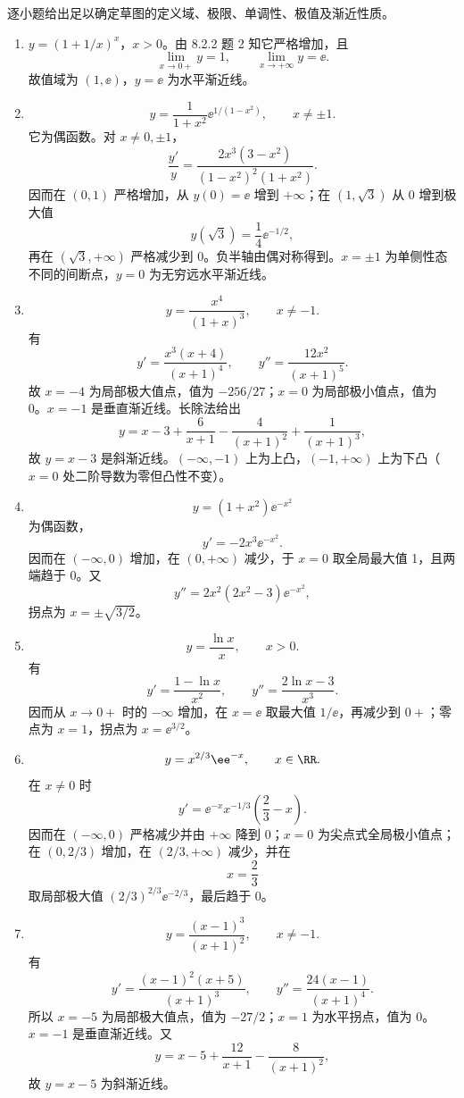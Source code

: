 \begin{xsolution}
逐小题给出足以确定草图的定义域、极限、单调性、极值及渐近性质。
\begin{enumerate}[label=(\arabic*)]
  \item $y=(1+1/x)^x$，$x>0$。由 8.2.2 题 2 知它严格增加，且
  \[
    \lim_{x\to0+}y=1,
    \qquad
    \lim_{x\to+\infty}y=\ee.
  \]
  故值域为 $(1,\ee)$，$y=\ee$ 为水平渐近线。

  \item
  \[
    y=\frac1{1+x^2}\ee^{1/(1-x^2)},
    \qquad x\ne\pm1.
  \]
  它为偶函数。对 $x\ne0,\pm1$，
  \[
    \frac{y'}y=
    \frac{2x^3(3-x^2)}{(1-x^2)^2(1+x^2)}.
  \]
  因而在 $(0,1)$ 严格增加，从 $y(0)=\ee$ 增到 $+\infty$；在 $(1,\sqrt3)$ 从 $0$ 增到极大值
  \[
    y(\sqrt3)=\frac14\ee^{-1/2},
  \]
  再在 $(\sqrt3,+\infty)$ 严格减少到 0。负半轴由偶对称得到。$x=\pm1$ 为单侧性态不同的间断点，$y=0$ 为无穷远水平渐近线。

  \item
  \[
    y=\frac{x^4}{(1+x)^3},\qquad x\ne-1.
  \]
  有
  \[
    y'=\frac{x^3(x+4)}{(x+1)^4},
    \qquad
    y''=\frac{12x^2}{(x+1)^5}.
  \]
  故 $x=-4$ 为局部极大值点，值为 $-256/27$；$x=0$ 为局部极小值点，值为 0。$x=-1$ 是垂直渐近线。长除法给出
  \[
    y=x-3+\frac6{x+1}-\frac4{(x+1)^2}+\frac1{(x+1)^3},
  \]
  故 $y=x-3$ 是斜渐近线。$(-\infty,-1)$ 上为上凸，$(-1,+\infty)$ 上为下凸（$x=0$ 处二阶导数为零但凸性不变）。

  \item
  \[
    y=(1+x^2)\ee^{-x^2}
  \]
  为偶函数，
  \[
    y'=-2x^3\ee^{-x^2}.
  \]
  因而在 $(-\infty,0)$ 增加，在 $(0,+\infty)$ 减少，于 $x=0$ 取全局最大值 1，且两端趋于 0。又
  \[
    y''=2x^2(2x^2-3)\ee^{-x^2},
  \]
  拐点为 $x=\pm\sqrt{3/2}$。

  \item
  \[
    y=\frac{\ln x}{x},\qquad x>0.
  \]
  有
  \[
    y'=\frac{1-\ln x}{x^2},
    \qquad
    y''=\frac{2\ln x-3}{x^3}.
  \]
  因而从 $x\to0+$ 时的 $-\infty$ 增加，在 $x=\ee$ 取最大值 $1/\ee$，再减少到 $0+$；零点为 $x=1$，拐点为 $x=\ee^{3/2}$。

  \item
  \[
    y=x^{2/3}\ee^{-x},\qquad x\in\RR.
  \]
  在 $x\ne0$ 时
  \[
    y'=\ee^{-x}x^{-1/3}\left(\frac23-x\right).
  \]
  因而在 $(-\infty,0)$ 严格减少并由 $+\infty$ 降到 0；$x=0$ 为尖点式全局极小值点；在 $(0,2/3)$ 增加，在 $(2/3,+\infty)$ 减少，并在
  \[
    x=\frac23
  \]
  取局部极大值 $(2/3)^{2/3}\ee^{-2/3}$，最后趋于 0。

  \item
  \[
    y=\frac{(x-1)^3}{(x+1)^2},\qquad x\ne-1.
  \]
  有
  \[
    y'=\frac{(x-1)^2(x+5)}{(x+1)^3},
    \qquad
    y''=\frac{24(x-1)}{(x+1)^4}.
  \]
  所以 $x=-5$ 为局部极大值点，值为 $-27/2$；$x=1$ 为水平拐点，值为 0。$x=-1$ 是垂直渐近线。又
  \[
    y=x-5+\frac{12}{x+1}-\frac8{(x+1)^2},
  \]
  故 $y=x-5$ 为斜渐近线。


\end{enumerate}
\end{xsolution}

